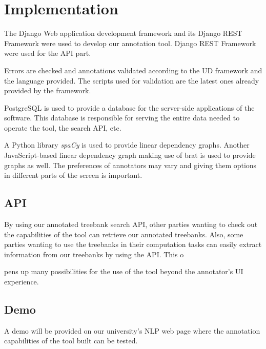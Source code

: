 \section{Implementation}
\label{sec:implementation}

The Django\cite{django} Web application development framework and its Django REST Framework\cite{drf} were used to develop our annotation tool.
Django REST Framework were used for the API part.

Errors are checked and annotations validated according to the UD framework and the language provided.
The scripts used for validation are the latest ones already provided by the framework.\cite{UD-git}

PostgreSQL\cite{psql} is used to provide a database for the server-side applications of the software.
This database is responsible for serving the entire data needed to operate the tool, the search API, etc.

A Python library \textit{spaCy}\cite{spacy} is used to provide linear dependency graphs.
Another JavaScript-based linear dependency graph\cite{spyssalo} making use of brat\cite{brat-vis} is used to provide graphs as well.
The preferences of annotators may vary and giving them options in different parts of the screen is important.

\subsection{API}
\label{sec:api}

By using our annotated treebank search API, other parties wanting to check out the capabilities of the tool can retrieve our annotated treebanks.
Also, some parties wanting to use the treebanks in their computation tasks can easily extract information from our treebanks by using the API.
This o



pens up many possibilities for the use of the tool beyond the annotator's UI experience.

\subsection{Demo}
\label{sec:demo}

A demo will be provided on our university's NLP web page where the annotation capabilities of the tool built can be tested.
